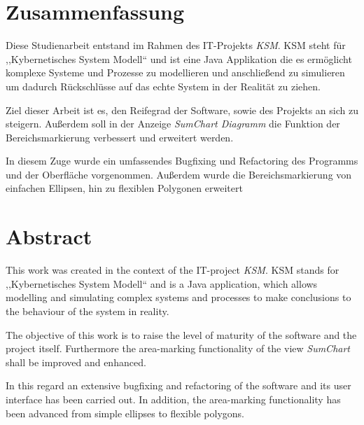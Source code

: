 \section*{Zusammenfassung}

Diese Studienarbeit entstand im Rahmen des IT-Projekts  \emph{KSM}. KSM steht für ,,Kybernetisches System Modell`` und ist eine Java Applikation die es ermöglicht komplexe Systeme und Prozesse zu modellieren und anschließend zu simulieren um dadurch Rückschlüsse auf das echte System in der Realität zu ziehen.

Ziel dieser Arbeit ist es, den Reifegrad der Software, sowie des Projekts an sich zu steigern. Außerdem soll in der Anzeige \emph{SumChart Diagramm} die Funktion der Bereichsmarkierung verbessert und erweitert werden.

In diesem Zuge wurde ein umfassendes Bugfixing und Refactoring des Programms und der Oberfläche vorgenommen. Außerdem wurde die Bereichsmarkierung von einfachen Ellipsen, hin zu flexiblen Polygonen erweitert
\newpage
\section*{Abstract}

This work was created in the context of the IT-project \emph{KSM}. KSM stands for ,,Kybernetisches System Modell`` and is a Java application, which allows modelling and simulating complex systems and processes to make conclusions to the behaviour of the system in reality.

The objective of this work is to raise the level of maturity of the software and the project itself. Furthermore the area-marking functionality of the view \emph{SumChart} shall be improved and enhanced.

In this regard an extensive bugfixing and refactoring of the software and its user interface has been carried out. In addition, the area-marking functionality has been advanced from simple ellipses to flexible polygons.